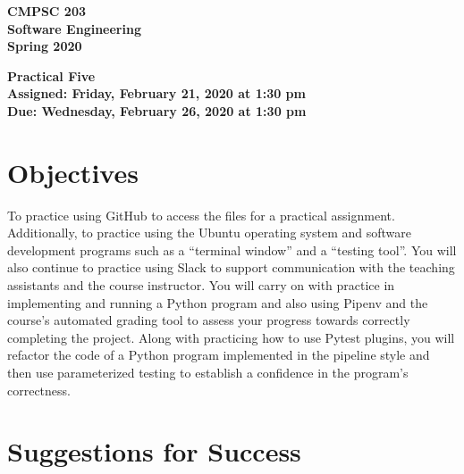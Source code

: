 \documentclass[11pt]{article}
\newcommand{\assignmentduedate}{February 26}
\newcommand{\assignmentassignedate}{February 21}
\newcommand{\assignmentnumber}{Five}
\newcommand{\labyear}{2020}
\newcommand{\labdueday}{Wednesday}
\newcommand{\labassignday}{Friday}
\newcommand{\labtime}{1:30 pm}
\newcommand{\assigneddate}{Assigned: \labassignday, \assignmentassignedate, \labyear{} at \labtime{}}
\newcommand{\duedate}{Due: \labdueday, \assignmentduedate, \labyear{} at \labtime{}}
\newcommand{\labtitle}[1]
{
  \begin{center}
    \begin{center}
      \bf
      CMPSC 203\\Software Engineering\\
      Spring 2020\\
      \medskip
    \end{center}
    \bf
    #1
  \end{center}
}
\begin{document}
\thispagestyle{empty}

\labtitle{Practical \assignmentnumber{} \\ \assigneddate{} \\ \duedate{}}

\section*{Objectives}

To practice using GitHub to access the files for a practical assignment.
Additionally, to practice using the Ubuntu operating system and software
development programs such as a ``terminal window'' and a ``testing tool''. You
will also continue to practice using Slack to support communication with the
teaching assistants and the course instructor. You will carry on with practice
in implementing and running a Python program and also using Pipenv and the
course's automated grading tool to assess your progress towards correctly
completing the project. Along with practicing how to use Pytest plugins, you
will refactor the code of a Python program implemented in the pipeline
style and then use parameterized testing to establish a confidence in the
program's correctness.

\section*{Suggestions for Success}
\end{document}
